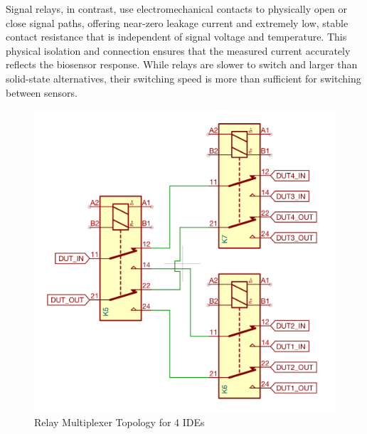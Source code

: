 
Signal relays, in contrast, use electromechanical contacts to physically open or close signal paths, offering near-zero leakage current and extremely low, stable contact resistance that is independent of signal voltage and temperature. This physical isolation and connection ensures that the measured current accurately reflects the biosensor response. While relays are slower to switch and larger than solid-state alternatives, their switching speed is more than sufficient for switching between sensors.
\begin{figure}[H]
    \centering
    \begin{minipage}{0.35\textwidth}
        \centering
        \includegraphics[width=\textwidth]{RelayTopologySchem.png}
        \caption[Relay Multiplexer Topology for 4 DUT's]{\newline Relay Multiplexer Topology for 4 \acp{IDE}}
        \label{fig:relay_topology}
    \end{minipage}\hfill
    \begin{minipage}{0.6\textwidth}

\end{minipage}
\end{figure}
